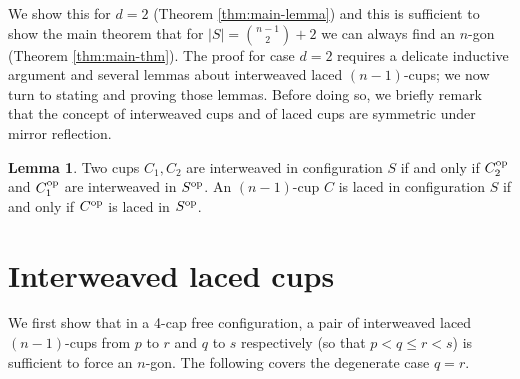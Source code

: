 \documentclass{amsart}
\newcommand{\txt}[1]{\textnormal{#1}}
\newcommand{\op}{\txt{op}}
\theoremstyle{definition}
\newtheorem{lemma}[thm]{Lemma}
\numberwithin{thm}{section}
\begin{document}
We show this for $d = 2$ (Theorem \ref{thm:main-lemma}) and this is sufficient to show the main theorem that for $|S| = \binom{n-1}{2} + 2$ we can always find an $n$-gon (Theorem \ref{thm:main-thm}).
The proof for case $d=2$ requires a delicate inductive argument and several lemmas about interweaved laced $(n-1)$-cups; we now turn to stating and proving those lemmas.
Before doing so, we briefly remark that the concept of interweaved cups and of laced cups are symmetric under mirror reflection.
\begin{lemma}
\label{lem:laced-mirror}
Two cups $C_1, C_2$ are interweaved in configuration $S$ if and only if $C_2^\op$ and $C_1^\op$ are interweaved in $S^\op$.
An $(n-1)$-cup $C$ is laced in configuration $S$ 
if and only if $C^\op$ is laced in $S^\op$.
\end{lemma}

\section{Interweaved laced cups}
\label{sec:laced}

We first show that in a 4-cap free configuration, a pair of interweaved laced $(n-1)$-cups from $p$ to $r$ and $q$ to $s$ respectively (so that $p < q \leq r < s$) is sufficient to force an $n$-gon.
The following covers the degenerate case $q = r$. 
\end{document}
